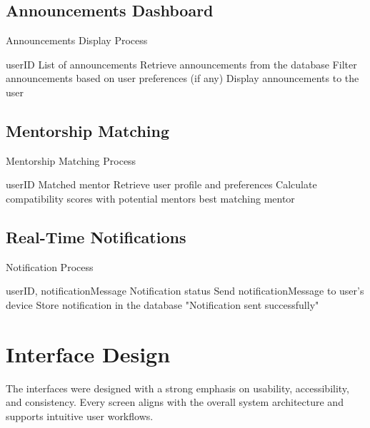 \subsection{Announcements Dashboard}
\begin{algorithm}[H]
\caption{Announcements Display Process}\label{alg:announcements}
\begin{algorithmic}[1]
\Require userID
\Ensure List of announcements
\State Retrieve announcements from the database
\State Filter announcements based on user preferences (if any)
\State Display announcements to the user
\end{algorithmic}
\end{algorithm}

\subsection{Mentorship Matching}
\begin{algorithm}[H]
\caption{Mentorship Matching Process}\label{alg:mentorship}
\begin{algorithmic}[1]
\Require userID
\Ensure Matched mentor
\State Retrieve user profile and preferences
\State Calculate compatibility scores with potential mentors
\State \Return best matching mentor
\end{algorithmic}
\end{algorithm}

\subsection{Real-Time Notifications}
\begin{algorithm}[H]
\caption{Notification Process}\label{alg:notifications}
\begin{algorithmic}[1]
\Require userID, notificationMessage
\Ensure Notification status
\State Send notificationMessage to user's device
\State Store notification in the database
\State \Return "Notification sent successfully"
\end{algorithmic}
\end{algorithm} 


\section{Interface Design}
\label{sec:interface_design}
The interfaces were designed with a strong emphasis on usability, accessibility, and consistency. Every screen aligns with the overall system architecture and supports intuitive user workflows.

